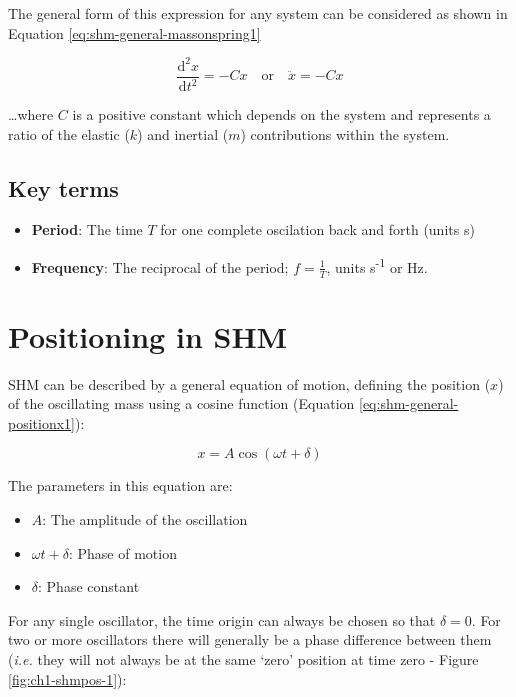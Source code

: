 \documentclass[
]{book}
\providecommand{\tightlist}{%
  \setlength{\itemsep}{0pt}\setlength{\parskip}{0pt}}
\begin{document}
The general form of this expression for any system can be considered as shown in Equation \eqref{eq:shm-general-massonspring1}

\begin{equation}
\frac{\textrm{d}^2 x}{\textrm{d} t^2} = -Cx \quad\mathrm{or}\quad\ddot{x} = -Cx
\label{eq:shm-general-massonspring1}
\end{equation}

\ldots where \(C\) is a positive constant which depends on the system and represents a ratio of the elastic (\(k\)) and inertial (\(m\)) contributions within the system.

\hypertarget{key-terms}{%
\subsection{Key terms}\label{key-terms}}

\begin{itemize}
\tightlist
\item
  \textbf{Period}: The time \(T\) for one complete oscilation back and forth (units s)
\item
  \textbf{Frequency}: The reciprocal of the period; \(f = \frac{1}{T}\), units s\textsuperscript{-1} or Hz.
\end{itemize}

\hypertarget{sec-shm-position}{%
\section{Positioning in SHM}\label{sec-shm-position}}

SHM can be described by a general equation of motion, defining the position (\(x\)) of the oscillating mass using a cosine function (Equation \eqref{eq:shm-general-positionx1}):

\begin{equation}
x = A \cos (\omega t + \delta)
\label{eq:shm-general-positionx1}
\end{equation}

The parameters in this equation are:

\begin{itemize}
\tightlist
\item
  \(A\): The amplitude of the oscillation
\item
  \(\omega t + \delta\): Phase of motion
\item
  \(\delta\): Phase constant
\end{itemize}

For any single oscillator, the time origin can always be chosen so that \(\delta = 0\). For two or more oscillators there will generally be a phase difference between them (\emph{i.e.} they will not always be at the same `zero' position at time zero - Figure \ref{fig:ch1-shmpos-1}):
\end{document}

